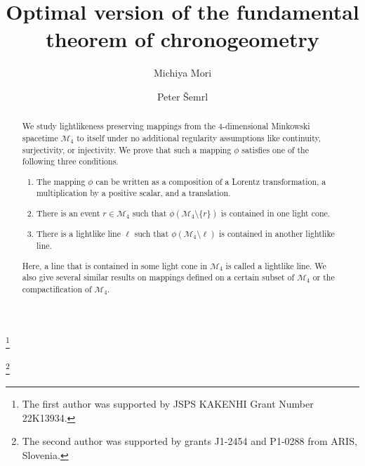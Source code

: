 \documentclass[10pt]{amsart}
\theoremstyle{definition}
\theoremstyle{remark}
\numberwithin{subsection}{section}
\numberwithin{equation}{section}
\begin{document}

\title{Optimal version of the fundamental theorem of chronogeometry}


\author{Michiya Mori}
\address{Graduate School of Mathematical Sciences, The University of Tokyo, 3-8-1 Komaba, Meguro-ku, Tokyo, 153-8914, Japan; Center for Interdisciplinary Theoretical and Mathematical Sciences (iTHEMS), RIKEN, 2-1 Hirosawa, Wako, Saitama, 351-0198, Japan}
\curraddr{}
\thanks{The first author was supported by JSPS KAKENHI Grant Number 22K13934.}

\author{Peter \v{S}emrl}
\address{Institute of Mathematics, Physics, and Mechanics, Jadranska 19, SI-1000 Ljubljana, Slovenia; Faculty of Mathematics and Physics, University of Ljubljana, Jadranska 19, SI-1000 Ljubljana, Slovenia}
\curraddr{}
\thanks{The second author was supported by grants J1-2454 and P1-0288 from ARIS, Slovenia.}

\date{}




\begin{abstract}
We study lightlikeness preserving mappings from the $4$-dimensional Minkowski spacetime $\mathcal{M}_4$ to itself under no additional regularity assumptions like continuity, surjectivity, or injectivity. 
We prove that such a mapping $\phi$ satisfies one of the following three conditions.
\begin{enumerate}
\item The mapping $\phi$ can be written as a composition of a Lorentz transformation, a multiplication by a positive scalar, and a translation. 
\item There is an event $r\in \mathcal{M}_4$ such that $\phi(\mathcal{M}_4\setminus\{r\})$ is contained in one light cone. 
\item There is a lightlike line $\ell$ such that $\phi(\mathcal{M}_4\setminus \ell)$ is contained in another lightlike line. 
\end{enumerate}
Here, a line that is contained in some light cone in $\mathcal{M}_4$ is called a lightlike line.
We also give several similar results on mappings defined on a certain subset of $\mathcal{M}_4$ or the compactification of $\mathcal{M}_4$. 
\end{abstract}
\end{document}
